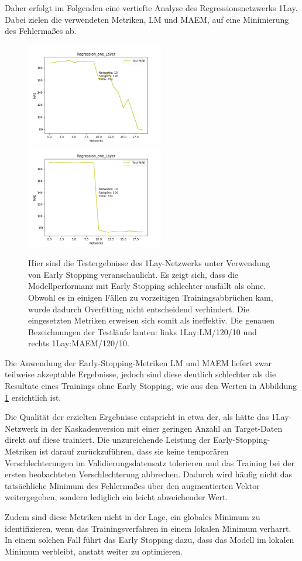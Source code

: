 Daher erfolgt im Folgenden eine vertiefte Analyse des Regressionsnetzwerks 1Lay. Dabei zielen die verwendeten Metriken, LM und MAEM, auf eine 
Minimierung des Fehlermaßes ab.

\begin{figure}[htpb]
    \includegraphics[height=4.5cm]{../../Plots/ba_plots/earlystopping/lossmetric/onelayer_ts.png}
    \includegraphics[height=4.5cm]{../../Plots/ba_plots/earlystopping/intermetric/onelayer_ts.png}
    \caption{\label{fig:onelayermetrics} 
    \small{Hier sind die Testergebnisse des 1Lay-Netzwerks unter Verwendung von Early Stopping veranschaulicht. Es zeigt sich, 
    dass die Modellperformanz mit Early Stopping schlechter ausfällt als ohne. 
    Obwohl es in einigen Fällen zu vorzeitigen Trainingsabbrüchen kam, wurde dadurch Overfitting nicht entscheidend verhindert. 
    Die eingesetzten Metriken erweisen sich somit als ineffektiv. 
    Die genauen Bezeichnungen der Testläufe lauten: links 1Lay:LM/120/10 und rechts 1Lay:MAEM/120/10.}}
\end{figure}

Die Anwendung der Early-Stopping-Metriken LM und MAEM liefert zwar teilweise akzeptable Ergebnisse, jedoch sind diese deutlich schlechter als die 
Resultate eines Trainings ohne Early Stopping, wie aus den Werten in Abbildung \ref{fig:onelayermetrics} ersichtlich ist.

Die Qualität der erzielten Ergebnisse entspricht in etwa der, als hätte das 1Lay-Netzwerk in der Kaskadenversion mit einer geringen Anzahl an 
Target-Daten direkt auf diese trainiert. Die unzureichende Leistung der Early-Stopping-Metriken ist darauf zurückzuführen, dass sie keine temporären 
Verschlechterungen im Validierungsdatensatz tolerieren und das Training bei der ersten beobachteten Verschlechterung abbrechen. Dadurch wird 
häufig nicht das tatsächliche Minimum des Fehlermaßes über den augmentierten Vektor weitergegeben, sondern lediglich ein leicht abweichender 
Wert.

Zudem sind diese Metriken nicht in der Lage, ein globales Minimum zu identifizieren, wenn das Trainingsverfahren in einem lokalen Minimum 
verharrt. In einem solchen Fall führt das Early Stopping dazu, dass das Modell im lokalen Minimum verbleibt, anstatt weiter zu 
optimieren.
